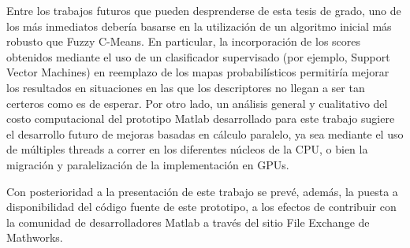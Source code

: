 Entre los trabajos futuros que pueden desprenderse de esta tesis de grado, uno de los más inmediatos debería basarse en la utilización de un algoritmo inicial más robusto que Fuzzy C-Means. En particular, la incorporación de los scores obtenidos mediante el uso de un clasificador supervisado (por ejemplo, Support Vector Machines) en reemplazo de los mapas probabilísticos permitiría mejorar los resultados en situaciones en las que los descriptores no llegan a ser tan certeros como es de esperar. Por otro lado, un análisis general y cualitativo del costo computacional del prototipo Matlab desarrollado para este trabajo sugiere el desarrollo futuro de mejoras basadas en cálculo paralelo, ya sea mediante el uso de múltiples threads a correr en los diferentes núcleos de la CPU, o bien la migración y paralelización de la implementación en GPUs.

Con posterioridad a la presentación de este trabajo se prevé, además, la puesta a disponibilidad del código fuente de este prototipo, a los efectos de contribuir con la comunidad de desarrolladores Matlab a través del sitio File Exchange de Mathworks.